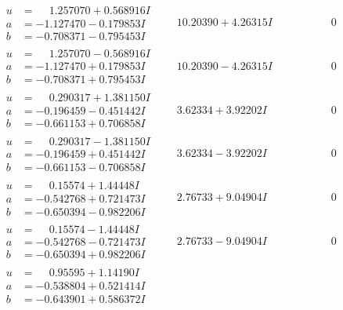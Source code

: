 \documentclass[1p]{elsarticle_modified}
\theoremstyle{definition}
\begin{document}
$$\begin{array}{c|c|c}
\begin{aligned}
u &= \phantom{-}1.257070 + 0.568916 I \\
a &= -1.127470 - 0.179853 I \\
b &= -0.708371 - 0.795453 I\end{aligned}
 & \phantom{-}10.20390 + 4.26315 I & \phantom{-0.000000 } 0 \\ \hline\begin{aligned}
u &= \phantom{-}1.257070 - 0.568916 I \\
a &= -1.127470 + 0.179853 I \\
b &= -0.708371 + 0.795453 I\end{aligned}
 & \phantom{-}10.20390 - 4.26315 I & \phantom{-0.000000 } 0 \\ \hline\begin{aligned}
u &= \phantom{-}0.290317 + 1.381150 I \\
a &= -0.196459 - 0.451442 I \\
b &= -0.661153 + 0.706858 I\end{aligned}
 & \phantom{-}3.62334 + 3.92202 I & \phantom{-0.000000 } 0 \\ \hline\begin{aligned}
u &= \phantom{-}0.290317 - 1.381150 I \\
a &= -0.196459 + 0.451442 I \\
b &= -0.661153 - 0.706858 I\end{aligned}
 & \phantom{-}3.62334 - 3.92202 I & \phantom{-0.000000 } 0 \\ \hline\begin{aligned}
u &= \phantom{-}0.15574 + 1.44448 I \\
a &= -0.542768 + 0.721473 I \\
b &= -0.650394 - 0.982206 I\end{aligned}
 & \phantom{-}2.76733 + 9.04904 I & \phantom{-0.000000 } 0 \\ \hline\begin{aligned}
u &= \phantom{-}0.15574 - 1.44448 I \\
a &= -0.542768 - 0.721473 I \\
b &= -0.650394 + 0.982206 I\end{aligned}
 & \phantom{-}2.76733 - 9.04904 I & \phantom{-0.000000 } 0 \\ \hline\begin{aligned}
u &= \phantom{-}0.95595 + 1.14190 I \\
a &= -0.538804 + 0.521414 I \\
b &= -0.643901 + 0.586372 I\end{aligned}

\end{array}$$
\end{document}
